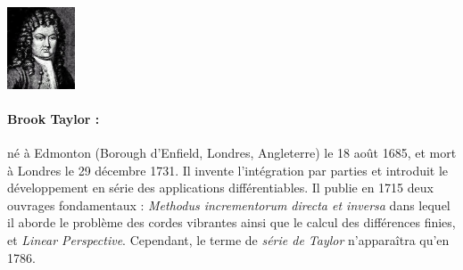 \vspace*{2cm}


\begin{minipage}{0.2\linewidth}
\begin{center}\includegraphics[width=2cm]{images/Taylor.jpg}\end{center}
\end{minipage}
\begin{minipage}{0.80 \linewidth}
\small{\paragraph*{Brook Taylor :} né à Edmonton (Borough d'Enfield, Londres, Angleterre) le 18 août 1685, et mort à Londres le 29 décembre 1731. Il invente l'intégration par parties et introduit le développement en série des applications différentiables. Il publie en 1715 deux ouvrages fondamentaux : \textit{Methodus incrementorum directa et inversa} dans lequel il aborde le problème des cordes vibrantes ainsi que le calcul des différences finies, et \textit{Linear Perspective}. Cependant, le terme de \textit{série de Taylor} n'apparaîtra qu'en 1786.}
\end{minipage}